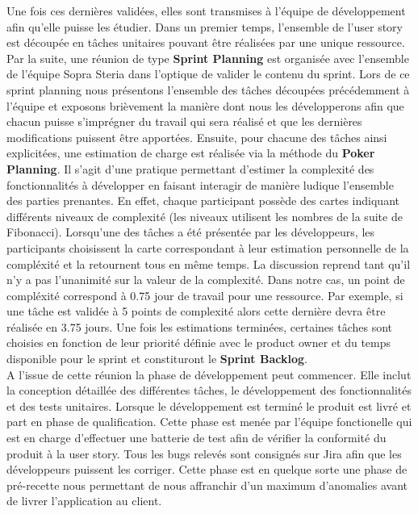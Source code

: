 	Une fois ces dernières validées, elles sont transmises à l'équipe de développement afin qu'elle puisse les étudier. Dans un premier temps, l’ensemble de l’user story est découpée en tâches unitaires pouvant être réalisées par une unique ressource. Par la suite, une réunion de type \textbf{Sprint Planning} est organisée avec l'ensemble de l'équipe Sopra Steria dans l’optique de valider le contenu du sprint. Lors de ce sprint planning nous présentons l’ensemble des tâches découpées précédemment à l’équipe et exposons brièvement la manière dont nous les développerons afin que chacun puisse s’imprégner du travail qui sera réalisé et que les dernières modifications puissent être apportées. Ensuite, pour chacune des tâches ainsi explicitées, une estimation de charge est réalisée via la méthode du \textbf{Poker Planning}. Il s’agit d’une pratique permettant d’estimer la complexité des fonctionnalités à développer en faisant interagir de manière ludique l’ensemble des parties prenantes. En effet, chaque participant possède des cartes indiquant différents niveaux de complexité (les niveaux utilisent les nombres de la suite de Fibonacci). Lorsqu’une des tâches a été présentée par les développeurs, les participants choisissent la carte correspondant à leur estimation personnelle de la compléxité et la retournent tous en même temps. La discussion reprend tant qu’il n’y a pas l’unanimité sur la valeur de la complexité. Dans notre cas, un point de compléxité correspond à 0.75 jour de travail pour une ressource. Par exemple, si une tâche est validée à 5 points de complexité alors cette dernière devra être réalisée en 3.75 jours. Une fois les estimations terminées, certaines tâches sont choisies en fonction de leur priorité définie avec le product owner et du temps disponible pour le sprint et constituront le \textbf{Sprint Backlog}.\\
	
	A l'issue de cette réunion la phase de développement peut commencer. Elle inclut la conception détaillée des différentes tâches, le développement des fonctionnalités et des tests unitaires. Lorsque le développement est terminé le produit est livré et part en phase de qualification. Cette phase est menée par l'équipe fonctionelle qui est en charge d'effectuer une batterie de test afin de vérifier la conformité du produit à la user story. Tous les bugs relevés sont consignés sur Jira afin que les développeurs puissent les corriger. Cette phase est en quelque sorte une phase de pré-recette nous permettant de nous affranchir d'un maximum d'anomalies avant de livrer l'application au client.

